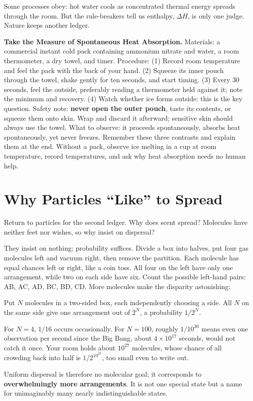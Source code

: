 Some processes obey: hot water cools as concentrated thermal energy spreads through the room. But the rule-breakers tell us enthalpy, $\Delta H$, is only one judge. Nature keeps another ledger.

\begin{shiyan}
\textbf{Take the Measure of Spontaneous Heat Absorption.} Materials: a commercial instant cold pack containing ammonium nitrate and water, a room thermometer, a dry towel, and timer. Procedure: (1) Record room temperature and feel the pack with the back of your hand. (2) Squeeze its inner pouch through the towel, shake gently for ten seconds, and start timing. (3) Every 30 seconds, feel the outside, preferably reading a thermometer held against it; note the minimum and recovery. (4) Watch whether ice forms outside: this is the key question. Safety note: \textbf{never open the outer pouch}, taste its contents, or squeeze them onto skin. Wrap and discard it afterward; sensitive skin should always use the towel. What to observe: it proceeds spontaneously, absorbs heat spontaneously, yet never freezes. Remember these three contrasts and explain them at the end. Without a pack, observe ice melting in a cup at room temperature, record temperatures, and ask why heat absorption needs no human help.
\end{shiyan}

\section{Why Particles ``Like'' to Spread}

Return to particles for the second ledger. Why does scent spread? Molecules have neither feet nor wishes, so why insist on dispersal?

They insist on nothing; probability suffices. Divide a box into halves, put four gas molecules left and vacuum right, then remove the partition. Each molecule has equal chances left or right, like a coin toss. All four on the left have only one arrangement, while two on each side have six. Count the possible left-hand pairs: AB, AC, AD, BC, BD, CD. More molecules make the disparity astonishing:

\begin{qiaoliang}
Put $N$ molecules in a two-sided box, each independently choosing a side. All $N$ on the same side give one arrangement out of $2^N$, a probability $1/2^N$.

For $N=4$, $1/16$ occurs occasionally. For $N=100$, roughly $1/10^{30}$ means even one observation per second since the Big Bang, about $4\times10^{17}$ seconds, would not catch it once. Your room holds about $10^{27}$ molecules, whose chance of all crowding back into half is $1/2^{10^{27}}$, too small even to write out.

Uniform dispersal is therefore no molecular goal; it corresponds to \textbf{overwhelmingly more arrangements}. It is not one special state but a name for unimaginably many nearly indistinguishable states.
\end{qiaoliang}

